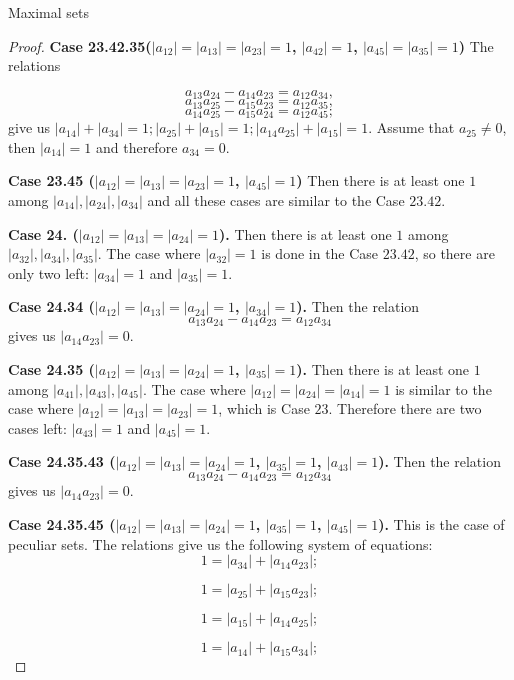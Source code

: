 \documentclass[12pt]{article}
\begin{document}
\begin{section}{Maximal sets}
\begin{proof}
         \textbf{Case 23.42.35($|a_{12}|=|a_{13}|=|a_{23}|=1$, $|a_{42}|=1$, $|a_{45}|=|a_{35}|=1$)} 
     The relations 
         
         $$
            a_{13}a_{24} - a_{14}a_{23} = a_{12}a_{34},
         $$
           $$
            a_{13}a_{25} - a_{15}a_{23} = a_{12}a_{35},
         $$
       $$
            a_{14}a_{25} - a_{15}a_{24} = a_{12}a_{45};
        $$
         give us $|a_{14}|+|a_{34}|=1; |a_{25}| + |a_{15}|=1; |a_{14}a_{25}| + |a_{15}|=1.$ Assume that $a_{25}\neq 0$, then $|a_{14}|=1$ and therefore $a_{34}=0.$ 
    
        \textbf{Case 23.45 ($|a_{12}|=|a_{13}|=|a_{23}|=1$, $|a_{45}|=1$)} Then there is at least one $1$ among $|a_{14}|,|a_{24}|,|a_{34}|$ and all these cases are similar to the Case $23.42$.
        
    
        \textbf{Case 24. ($|a_{12}|=|a_{13}|=|a_{24}|=1$).} Then there is at least one $1$ among $|a_{32}|,|a_{34}|,|a_{35}|$. The case where $|a_{32}|=1$ is done in the Case $23.42$, so there are only two left: $|a_{34}|=1$ and $|a_{35}|=1$.
    
        \textbf{Case 24.34 ($|a_{12}|=|a_{13}|=|a_{24}|=1$, $|a_{34}|=1$).} Then the relation 
        $$
            a_{13}a_{24} - a_{14}a_{23} = a_{12}a_{34}
        $$
        gives us $|a_{14}a_{23}|=0$.
    
        \textbf{Case 24.35 ($|a_{12}|=|a_{13}|=|a_{24}|=1$, $|a_{35}|=1$).}  Then there is at least one $1$ among $|a_{41}|,|a_{43}|,|a_{45}|$. The case where $|a_{12}|=|a_{24}| = |a_{14}| = 1$ is similar to the case where $|a_{12}|=|a_{13}| = |a_{23}|=1$, which is Case $23$. Therefore there are two cases left: $|a_{43}|=1$ and $|a_{45}|=1$.
    
         \textbf{Case 24.35.43 ($|a_{12}|=|a_{13}|=|a_{24}|=1$, $|a_{35}|=1$, $|a_{43}|=1$).} Then the relation 
        $$
            a_{13}a_{24} - a_{14}a_{23} = a_{12}a_{34}
        $$
        gives us $|a_{14}a_{23}|=0$.
    
          \textbf{Case 24.35.45 ($|a_{12}|=|a_{13}|=|a_{24}|=1$, $|a_{35}|=1$, $|a_{45}|=1$).} This is the case of peculiar sets. The relations give us the following system of equations: 
    $$
        1 = |a_{34}| + |a_{14}a_{23}|;
    $$
    
    $$
        1 = |a_{25}| + |a_{15}a_{23}|;
    $$
    
    $$
        1 = |a_{15}| + |a_{14}a_{25}|;
    $$
    
    $$
        1 = |a_{14}| + |a_{15}a_{34}|;
    $$
    

\end{proof}
\end{section}
\end{document}
